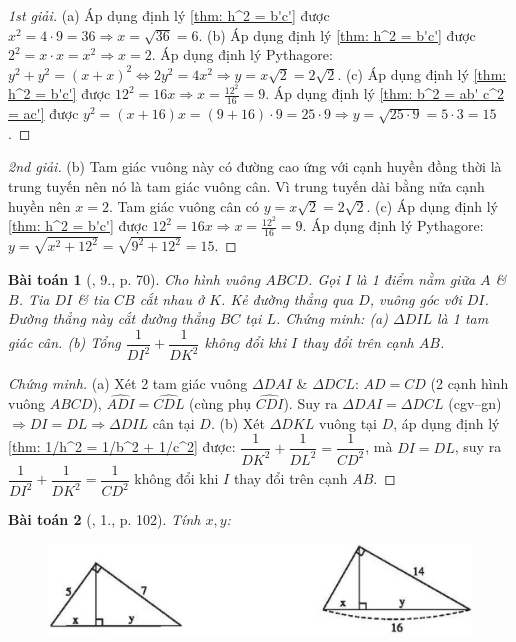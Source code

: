 \documentclass{article}
\newtheorem{baitoan}{Bài toán}
\begin{document}
\begin{proof}[1st giải]
	(a) Áp dụng định lý \ref{thm: h^2 = b'c'} được $x^2 = 4\cdot9 = 36\Rightarrow x = \sqrt{36} = 6$. (b) Áp dụng định lý \ref{thm: h^2 = b'c'} được $2^2 = x\cdot x = x^2\Rightarrow x = 2$. Áp dụng định lý Pythagore: $y^2 + y^2 = (x + x)^2\Leftrightarrow 2y^2 = 4x^2\Rightarrow y = x\sqrt{2} = 2\sqrt{2}$. (c) Áp dụng định lý \ref{thm: h^2 = b'c'} được $12^2 = 16x\Rightarrow x = \frac{12^2}{16} = 9$. Áp dụng định lý \ref{thm: b^2 = ab' c^2 = ac'} được $y^2 = (x + 16)x = (9 + 16)\cdot9 = 25\cdot9\Rightarrow y = \sqrt{25\cdot9} = 5\cdot3 = 15$.
\end{proof}

\begin{proof}[2nd giải]
	(b) Tam giác vuông này có đường cao ứng với cạnh huyền đồng thời là trung tuyến nên nó là tam giác vuông cân. Vì trung tuyến dài bằng nửa cạnh huyền nên $x = 2$. Tam giác vuông cân có $y = x\sqrt{2} = 2\sqrt{2}$. (c) Áp dụng định lý \ref{thm: h^2 = b'c'} được $12^2 = 16x\Rightarrow x = \frac{12^2}{16} = 9$. Áp dụng định lý Pythagore: $y = \sqrt{x^2 + 12^2} = \sqrt{9^2 + 12^2} = 15$.
\end{proof}

\begin{baitoan}[\cite{SGK_Toan_9_tap_1}, 9., p. 70]
	Cho hình vuông $ABCD$. Gọi $I$ là 1 điểm nằm giữa $A$ \& $B$. Tia $DI$ \& tia $CB$ cắt nhau ở $K$. Kẻ đường thẳng qua $D$, vuông góc với $DI$. Đường thẳng này cắt đường thẳng $BC$ tại $L$. Chứng minh: (a) $\Delta DIL$ là 1 tam giác cân. (b) Tổng $\dfrac{1}{DI^2} + \dfrac{1}{DK^2}$ không đổi khi $I$ thay đổi trên cạnh $AB$.	
\end{baitoan}

\begin{proof}[Chứng minh]
	(a) Xét 2 tam giác vuông $\Delta DAI$ \& $\Delta DCL$: $AD = CD$ (2 cạnh hình vuông $ABCD$), $\widehat{ADI} = \widehat{CDL}$ (cùng phụ $\widehat{CDI}$). Suy ra $\Delta DAI = \Delta DCL$ (cgv--gn) $\Rightarrow DI = DL\Rightarrow\Delta DIL$ cân tại $D$. (b) Xét $\Delta DKL$ vuông tại $D$, áp dụng định lý \ref{thm: 1/h^2 = 1/b^2 + 1/c^2} được: $\dfrac{1}{DK^2} + \dfrac{1}{DL^2} = \dfrac{1}{CD^2}$, mà $DI = DL$, suy ra $\dfrac{1}{DI^2} + \dfrac{1}{DK^2} = \dfrac{1}{CD^2}$ không đổi khi $I$ thay đổi trên cạnh $AB$. 
\end{proof}

\begin{baitoan}[\cite{SBT_Toan_9_tap_1}, 1., p. 102]
	Tính $x,y$:
	\begin{figure}[H]
		\centering
		\includegraphics[scale=.25]{SBT_Toan_9_1_p102}
	\end{figure}
\end{baitoan}
\end{document}
